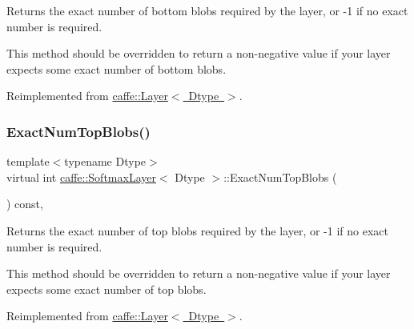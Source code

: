 Returns the exact number of bottom blobs required by the layer, or -\/1 if no exact number is required. 

This method should be overridden to return a non-\/negative value if your layer expects some exact number of bottom blobs. 

Reimplemented from \mbox{\hyperlink{classcaffe_1_1_layer_a8e5ee0494d85f5f55fc4396537cbc60f}{caffe\+::\+Layer$<$ Dtype $>$}}.

\mbox{\label{classcaffe_1_1_softmax_layer_a6bc4748c20e0940e5367ed4d50f4a11b}} 
\subsubsection{\texorpdfstring{Exact\+Num\+Top\+Blobs()}{ExactNumTopBlobs()}\hspace{0.1cm}{\footnotesize\ttfamily [1/2]}}
{\footnotesize\ttfamily template$<$typename Dtype$>$ \\
virtual int \mbox{\hyperlink{classcaffe_1_1_softmax_layer}{caffe\+::\+Softmax\+Layer}}$<$ Dtype $>$\+::Exact\+Num\+Top\+Blobs (\begin{DoxyParamCaption}{ }\end{DoxyParamCaption}) const\hspace{0.3cm}{\ttfamily [inline]}, {\ttfamily [virtual]}}



Returns the exact number of top blobs required by the layer, or -\/1 if no exact number is required. 

This method should be overridden to return a non-\/negative value if your layer expects some exact number of top blobs. 

Reimplemented from \mbox{\hyperlink{classcaffe_1_1_layer_a64e2ca72c719e4b2f1f9216ccfb0d37f}{caffe\+::\+Layer$<$ Dtype $>$}}.

\mbox{\label{classcaffe_1_1_softmax_layer_a6bc4748c20e0940e5367ed4d50f4a11b}} 
